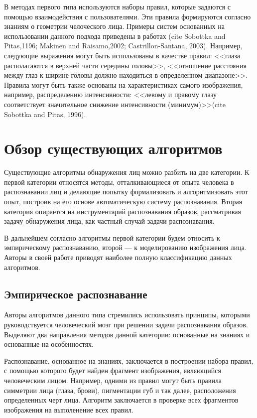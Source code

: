 В методах первого типа используются наборы правил, которые задаются с помощью взаимодействия с пользователями. Эти правила формируются согласно знаниям о геометрии челоческого лица. Примеры систем основанных на использовании данного подхода приведены в работах (cite Sobottka and Pitas,1196; Makinen and Raisamo,2002; Castrillon-Santana, 2003). Например, следующие выражения могут быть использованы в качестве правил: <<глаза располагаются в верхней части середины головы>>, <<отношение расстояния между глаз к ширине головы должно находиться в определенном диапазоне>>. Правила могут быть также основаны на характеристиках самого изображения, например, распределению интенсивности: <<левому и правому глазу соответствует значительное снижение интенсивности (минимум)>>(cite Sobottka and Pitas, 1996). 



\section{Обзор существующих алгоритмов}

Существующие алгоритмы обнаружения лиц можно разбить на две категории. К
первой категории относятся методы, отталкивающиеся от опыта человека в
распознавании лиц и делающие попытку формализовать и алгоритмизовать этот опыт,
построив на его основе автоматическую систему распознавания. Вторая категория
опирается на инструментарий распознавания образов, рассматривая задачу
обнаружения лица, как частный случай задачи распознавания. 

В дальнейшем согласно \cite{Veznevec_Degtyareva} алгоритмы первой категории
будем относить к эмпирическому распознаванию, второй --- к моделированию
изображения лица. Авторы \cite{Veznevec_Degtyareva} в своей работе приводят
наиболее полную классификацию данных алгоритмов.

\subsection{Эмпирическое распознавание}

Авторы алгоритмов данного типа стремились использовать принципы, которыми
руководствуется человеческий мозг при решении задачи распознавания образов.
Выделяют два направления методов данной категории: основанные на знаниях и
основанные на особенностях.

Распознавание, основанное на знаниях, заключается в построении набора правил, с
помощью которого будет найден фрагмент изображения, являющийся
человеческим лицом. Например, одними из правил могут быть правила симметрии
лица (глаза, брови), пигментации губ и так далее, расположения определенных
черт лица. Алгоритм заключается в проверке всех фрагментов изображения на
выполенение всех правил.

